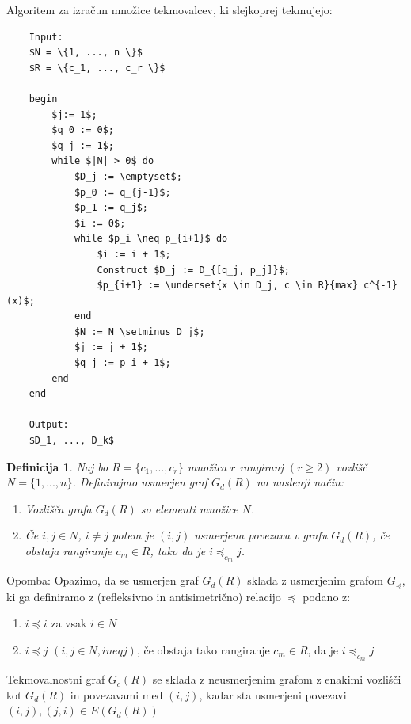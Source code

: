 \documentclass[a4paper, 12pt]{book}
\newtheorem{definicija}{Definicija}[chapter]
\begin{document}
Algoritem za izračun množice tekmovalcev, ki slejkoprej tekmujejo:
\begin{lstlisting}
    Input:
    $N = \{1, ..., n \}$
    $R = \{c_1, ..., c_r \}$
    
    begin
        $j:= 1$;
        $q_0 := 0$;
        $q_j := 1$;
        while $|N| > 0$ do
            $D_j := \emptyset$;
            $p_0 := q_{j-1}$;
            $p_1 := q_j$;
            $i := 0$;
            while $p_i \neq p_{i+1}$ do
                $i := i + 1$;
                Construct $D_j := D_{[q_j, p_j]}$;
                $p_{i+1} := \underset{x \in D_j, c \in R}{max} c^{-1}(x)$;
            end
            $N := N \setminus D_j$;
            $j := j + 1$;
            $q_j := p_i + 1$;
        end
    end

    Output: 
    $D_1, ..., D_k$
\end{lstlisting}

\begin{definicija}
    Naj bo $R = \{ c_1, ..., c_r \}$ množica $r$ rangiranj $(r \geq 2)$ vozlišč $N = \{ 1, ..., n \}$. Definirajmo usmerjen graf $G_d(R)$  na naslenji način:
    \begin{enumerate}[label=(\roman*)]
        \item Vozlišča grafa $G_d(R)$ so elementi množice $N$.
        \item Če $i, j \in N$, $i \neq j$ potem je $(i, j)$ usmerjena povezava v grafu $G_d(R)$, če obstaja rangiranje $c_m \in R$, tako da je $i \preceq_{c_m} j$.
    \end{enumerate}
\end{definicija}

Opomba: Opazimo, da se usmerjen graf $G_d(R)$ sklada z usmerjenim grafom $G_{\preceq}$, ki ga definiramo z (refleksivno in antisimetrično) relacijo $\preceq$ podano z:
\begin{enumerate}[label=(\roman*)]
    \item $i \preceq i$ za vsak $i \in N$
    \item $i \preceq j$ $(i,j \in N, i neq j)$, če obstaja tako rangiranje $c_m \in R$, da je $i \preceq_{c_m} j$
\end{enumerate}
Tekmovalnostni graf $G_c(R)$ se sklada z neusmerjenim grafom z enakimi vozlišči kot $G_d(R)$ in povezavami med $(i, j)$, kadar sta usmerjeni povezavi $(i, j), (j, i) \in E(G_d(R))$
\end{document}
